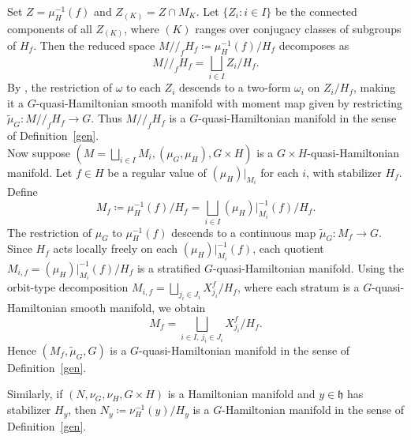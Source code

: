 \documentclass[reqno]{amsart}
\theoremstyle{plain}
\theoremstyle{definition}
\begin{document}
Set $Z = \mu_H^{-1}(f)$ and $Z_{(K)} = Z \cap M_K$. Let $\{Z_i : i \in I\}$ be the connected components of all $Z_{(K)}$, where $(K)$ ranges over conjugacy classes of subgroups of $H_f$. Then the reduced space $M /\!/_f H_f \coloneqq \mu_H^{-1}(f)/H_f$ decomposes as
\begin{equation}\label{loc. dec}
M /\!/_f H_f = \bigsqcup_{i \in I} Z_i / H_f.
\end{equation}
By \cite[Theorem~2.9]{hurtubise2006group}, the restriction of $\omega$ to each $Z_i$ descends to a two-form $\omega_i$ on $Z_i/H_f$, making it a $G$-quasi-Hamiltonian smooth manifold with moment map given by restricting $\tilde{\mu}_G: M /\!/_f H_f \to G$. Thus $M /\!/_f H_f$ is a $G$-quasi-Hamiltonian manifold in the sense of Definition~\ref{gen}.\\

Now suppose $(M = \bigsqcup_{i \in I} M_i, (\mu_G, \mu_H), G\times H)$ is a $G\times H$-quasi-Hamiltonian manifold. Let $f \in H$ be a regular value of $(\mu_H)|_{M_i}$ for each $i$, with stabilizer $H_f$. Define
\[
M_f \coloneqq \mu_H^{-1}(f)/H_f = \bigsqcup_{i \in I} (\mu_H)|_{M_i}^{-1}(f)/H_f.
\]
The restriction of $\mu_G$ to $\mu_H^{-1}(f)$ descends to a continuous map $\tilde{\mu}_G: M_f \to G$. Since $H_f$ acts locally freely on each $(\mu_H)|_{M_i}^{-1}(f)$, each quotient $M_{i,f} = (\mu_H)|_{M_i}^{-1}(f)/H_f$ is a stratified $G$-quasi-Hamiltonian manifold. Using the orbit-type decomposition $M_{i,f} = \bigsqcup_{j_i \in J_i} X^f_{j_i}/H_f$, where each stratum is a $G$-quasi-Hamiltonian smooth manifold, we obtain
\[
M_f = \bigsqcup_{i \in I,\, j_i \in J_i} X^f_{j_i}/H_f.
\]
Hence $(M_f, \tilde{\mu}_G, G)$ is a $G$-quasi-Hamiltonian manifold in the sense of Definition~\ref{gen}.

Similarly, if $(N, \nu_G, \nu_H, G\times H)$ is a Hamiltonian manifold and $y \in \mathfrak{h}$ has stabilizer $H_y$, then $N_y \coloneqq \nu_H^{-1}(y)/H_y$ is a $G$-Hamiltonian manifold in the sense of Definition~\ref{gen}.
\end{document}
